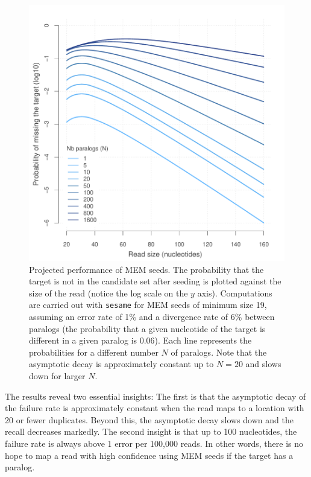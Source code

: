 \documentclass[a4,center,fleqn]{NAR}
\begin{document}
\begin{figure}[t]
\begin{center}
\includegraphics[scale=.6]{MEM_19.pdf}
\end{center}
\caption{Projected performance of MEM seeds. The probability that the
target is not in the candidate set after seeding  is plotted against the
size of the read (notice the log scale on the $y$ axis). Computations are
carried out with \texttt{sesame} for MEM seeds of minimum size 19,
assuming an error rate of 1\% and a divergence rate of 6\% between
paralogs (the probability that a given nucleotide of the target is
different in a given paralog is 0.06). Each line represents the
probabilities for a different number $N$ of paralogs. Note that the
asymptotic decay is approximately constant up to $N = 20$ and slows down
for larger $N$.}
\label{fig_MEM}
\end{figure}

The results reveal two essential insights: The first is that the
asymptotic decay of the failure rate is approximately constant when the
read maps to a location with 20 or fewer duplicates. Beyond this, the
asymptotic decay slows down and the recall decreases markedly. The second
insight is that up to 100 nucleotides, the failure rate is always above 1
error per 100,000 reads. In other words, there is no hope to map a read
with high confidence using MEM seeds if the target has a paralog.
\end{document}

